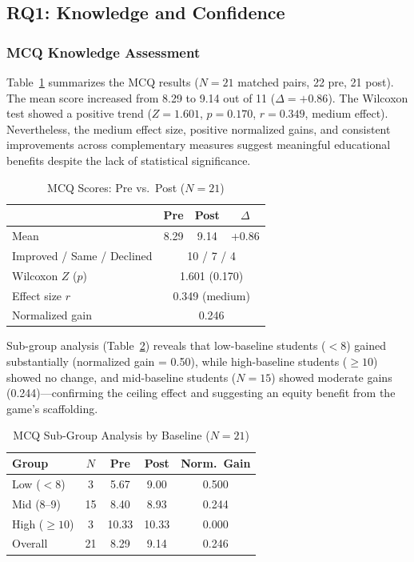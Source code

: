 \documentclass[conference]{IEEEtran}
\begin{document}
\subsection{RQ1: Knowledge and Confidence}

\subsubsection{MCQ Knowledge Assessment}

Table~\ref{tab:mcq} summarizes the MCQ results ($N = 21$ matched pairs, 22 pre, 21 post).
The mean score increased from 8.29 to 9.14 out of 11 ($\Delta = +0.86$).
The Wilcoxon test showed a positive trend ($Z = 1.601$, $p = 0.170$, $r = 0.349$, medium effect).
Nevertheless, the medium effect size, positive normalized gains, and consistent improvements across complementary measures suggest meaningful educational benefits despite the lack of statistical significance.
\begin{table}[htbp]
\caption{MCQ Scores: Pre vs.\ Post ($N = 21$)}
\label{tab:mcq}
\centering
\begin{tabular}{lccc}
\toprule
 & Pre & Post & $\Delta$ \\
\midrule
Mean & 8.29 & 9.14 & +0.86 \\
Improved / Same / Declined & \multicolumn{3}{c}{10 / 7 / 4} \\
Wilcoxon $Z$ ($p$) & \multicolumn{3}{c}{1.601 (0.170)} \\
Effect size $r$ & \multicolumn{3}{c}{0.349 (medium)} \\
Normalized gain & \multicolumn{3}{c}{0.246} \\
\bottomrule
\end{tabular}
\end{table}
Sub-group analysis (Table~\ref{tab:subgroup}) reveals that low-baseline students ($< 8$) gained substantially (normalized gain = 0.50), while high-baseline students ($\geq 10$) showed no change, and mid-baseline students ($N=15$) showed moderate gains (0.244)---confirming the ceiling effect and suggesting an equity benefit from the game's scaffolding.

\begin{table}[htbp]
\caption{MCQ Sub-Group Analysis by Baseline ($N = 21$)}
\label{tab:subgroup}
\centering
\begin{tabular}{lcccc}
\toprule
Group & $N$ & Pre & Post & Norm.\ Gain \\
\midrule
Low ($< 8$) & 3 & 5.67 & 9.00 & 0.500 \\
Mid (8--9) & 15 & 8.40 & 8.93 & 0.244 \\
High ($\geq 10$) & 3 & 10.33 & 10.33 & 0.000 \\
\midrule
Overall & 21 & 8.29 & 9.14 & 0.246 \\
\bottomrule
\end{tabular}
\end{table}
\end{document}
